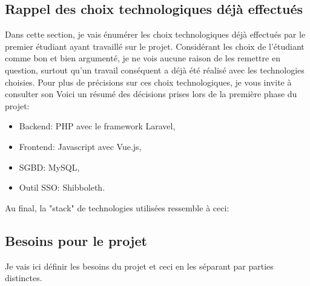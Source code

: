 \documentclass[
    iai, %
    il, %
]{heig-tb}
\begin{document}
\subsection{Rappel des choix technologiques déjà effectués}
Dans cette section, je vais énumérer les choix technologiques déjà effectués par le premier étudiant ayant travaillé sur le projet.
Considérant les choix de l'étudiant comme bon et bien argumenté, je ne vois aucune raison de les remettre en question, surtout qu'un travail conséquent a déjà été réalisé avec les technologies choisies. Pour plus de précisions sur ces choix technologiques, je vous invite à consulter son %
Voici un résumé des décisions prises lors de la première phase du projet:
\begin{itemize}
    \item Backend: PHP avec le framework Laravel, %
    \item Frontend: Javascript avec Vue.js, %
    \item SGBD: MySQL, %
    \item Outil SSO: Shibboleth. %
\end{itemize}

Au final, la "stack" de technologies utilisées ressemble à ceci:


\subsection{Besoins pour le projet}
Je vais ici définir les besoins du projet et ceci en les séparant par parties distinctes.
\end{document}
